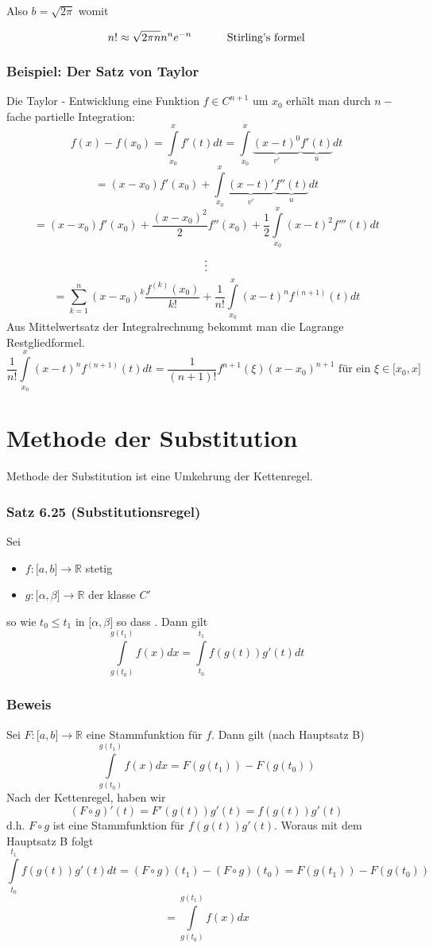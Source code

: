 Also $b=\sqrt{2\pi}$ womit 
\begin{framed}
\[n! \approx \sqrt {2\pi n} {n^n}{e^{ - n}}\text{\hspace{10mm} Stirling's formel}\]
\end{framed}
\subsubsection*{Beispiel: Der Satz von Taylor}
Die Taylor - Entwicklung eine Funktion $f\in C^{n+1}$ um $x_0$ erhält man durch $n-$fache partielle Integration:
\[f(x) - f({x_0}) = \int\limits_{{x_0}}^x {f'(t)dt = } \int\limits_{{x_0}}^x {\underbrace {{{(x - t)}^0}}_{v'}\underbrace {f'(t)}_udt} \]
\[ = (x - {x_0})f'({x_0}) + \int\limits_{{x_0}}^x {\underbrace {(x - t)'}_{v'}} \underbrace {f''(t)}_udt\]
\[ = (x - {x_0})f'({x_0}) + \frac{{{{(x - {x_0})}^2}}}{2}f''({x_0}) + \frac{1}{2}\int\limits_{{x_0}}^x {{{(x - t)}^2}f'''(t)dt} \]
$$\text{\vdots}$$
\[ = \sum\limits_{k = 1}^n {{{(x - {x_0})}^k}\frac{{{f^{(k)}}({x_0})}}{{k!}}}  + \frac{1}{{n!}}\int\limits_{{x_0}}^x {{{(x - t)}^n}{f^{(n + 1)}}(t)dt} \]
Aus Mittelwertsatz der Integralrechnung bekommt man die Lagrange Restgliedformel.
\[\frac{1}{{n!}}\int\limits_{{x_0}}^x {{{(x - t)}^n}{f^{(n + 1)}}(t)dt}  = \frac{1}{{(n + 1)!}}{f^{n + 1}}(\xi ){(x - {x_0})^{n + 1}}\text{ für ein }\xi\in\lbrack x_0,x\rbrack\]
\newpage
\section{Methode der Substitution}
Methode der Substitution ist eine Umkehrung der Kettenregel.
\subsubsection*{Satz 6.25 (Substitutionsregel)}
Sei 
\begin{itemize}
\item $f:\lbrack a,b\rbrack\rightarrow\mathbb{R}$ stetig
\item $g:\lbrack\alpha,\beta\rbrack\rightarrow\mathbb{R}$ der klasse $C'$
\end{itemize}
so wie $t_0\leq t_1$ in  $\lbrack\alpha,\beta\rbrack$ so dass .
Dann gilt 
\[\int\limits_{g({t_0})}^{g({t_1})} {f(x)dx = \int\limits_{{t_0}}^{{t_1}} {f\left( {g\left( t \right)} \right)g'\left( t \right)dt} } \]

\subsubsection*{Beweis}
Sei $F:\lbrack a,b\rbrack\rightarrow\mathbb{R}$ eine Stammfunktion für $f$. Dann gilt (nach Hauptsatz B)
\[\int\limits_{g({t_0})}^{g({t_1})} {f(x)dx = F\left( {g({t_1})} \right)}  - F\left( {g({t_0})} \right)\]
Nach der Kettenregel, haben wir
\[(F \circ g)'(t) = F'(g(t))g'(t) = f(g(t))g'(t)\]
d.h. $F\circ g$ ist eine Stammfunktion für $f(g(t))g'(t)$. Woraus mit dem Hauptsatz B folgt 
\[\int\limits_{{t_0}}^{{t_1}} {f\left( {g(t)} \right)} g'(t)dt = \left( {F \circ g} \right)({t_1}) - \left( {F \circ g} \right)({t_0}) = F\left( {g({t_1})} \right) - F\left( {g({t_0})} \right)\]
\[ = \int\limits_{g({t_0})}^{g({t_1})} {f(x)dx} \]

